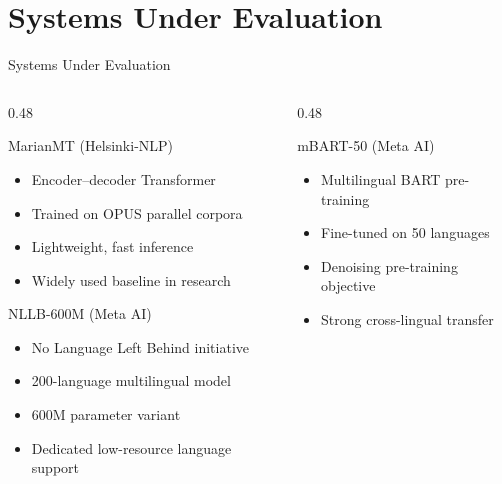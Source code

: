\documentclass[aspectratio=169]{beamer}
\begin{document}
\section{Systems Under Evaluation}

\begin{frame}{Systems Under Evaluation}
  \begin{columns}[T]
    \begin{column}{0.48\textwidth}
      \begin{block}{MarianMT (Helsinki-NLP)}
        \begin{itemize}
          \item Encoder–decoder Transformer
          \item Trained on OPUS parallel corpora
          \item Lightweight, fast inference
          \item Widely used baseline in research
        \end{itemize}
      \end{block}
      \vspace{0.3cm}
      \begin{block}{NLLB-600M (Meta AI)}
        \begin{itemize}
          \item No Language Left Behind initiative
          \item 200-language multilingual model
          \item 600M parameter variant
          \item Dedicated low-resource language support
        \end{itemize}
      \end{block}
    \end{column}
    \begin{column}{0.48\textwidth}
      \begin{block}{mBART-50 (Meta AI)}
        \begin{itemize}
          \item Multilingual BART pre-training
          \item Fine-tuned on 50 languages
          \item Denoising pre-training objective
          \item Strong cross-lingual transfer
        \end{itemize}
      \end{block}

\end{column}
\end{columns}
\end{frame}
\end{document}
